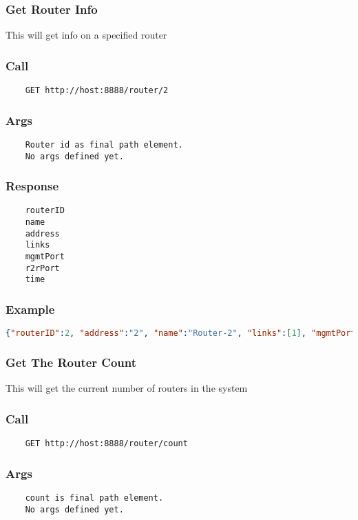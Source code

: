 \hr
\subsubsection{Get Router Info}
This will get info on a specified router
\subsubsection*{Call}
\begin{verbatim}
	GET http://host:8888/router/2
\end{verbatim}

\subsubsection*{Args}
\begin{verbatim}
	Router id as final path element.
	No args defined yet.
\end{verbatim}

\subsubsection*{Response}
\begin{verbatim}
	routerID 
	name
	address
	links
	mgmtPort
	r2rPort
	time
\end{verbatim}

\subsubsection*{Example}
\begin{lstlisting}[language=json]
{"routerID":2, "address":"2", "name":"Router-2", "links":[1], "mgmtPort":11003, "r2rPort":11004,  "time":1361817254727}
\end{lstlisting}


\hr
\subsubsection{Get The Router Count}
This will get the current number of routers in the system
\subsubsection*{Call}
\begin{verbatim}
	GET http://host:8888/router/count
\end{verbatim}

\subsubsection*{Args}
\begin{verbatim}
	count is final path element.
	No args defined yet.
\end{verbatim}

